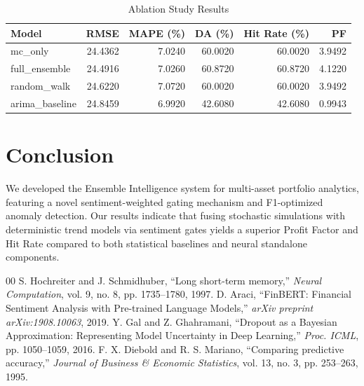 \documentclass[conference]{IEEEtran}
\begin{document}
\begin{table}[htbp]
\centering
\caption{Ablation Study Results}
\label{tab:model_comparison}
\begin{tabular}{l r r r r r}
\toprule
\textbf{Model} & \textbf{RMSE} & \textbf{MAPE (\%)} & \textbf{DA (\%)} & \textbf{Hit Rate (\%)} & \textbf{PF} \\
\midrule
mc\_only & 24.4362 & 7.0240 & 60.0020 & 60.0020 & 3.9492 \\
full\_ensemble & 24.4916 & 7.0260 & 60.8720 & 60.8720 & 4.1220 \\
random\_walk & 24.6220 & 7.0720 & 60.0020 & 60.0020 & 3.9492 \\
arima\_baseline & 24.8459 & 6.9920 & 42.6080 & 42.6080 & 0.9943 \\
\bottomrule
\end{tabular}
\end{table}

\section{Conclusion}
We developed the Ensemble Intelligence system for multi-asset portfolio 
analytics, featuring a novel sentiment-weighted gating mechanism and 
F1-optimized anomaly detection. Our results indicate that fusing 
stochastic simulations with deterministic trend models via sentiment 
gates yields a superior Profit Factor and Hit Rate compared to 
both statistical baselines and neural standalone components. 

\begin{thebibliography}{00}
 S. Hochreiter and J. Schmidhuber, ``Long short-term memory,'' \textit{Neural Computation}, vol. 9, no. 8, pp. 1735--1780, 1997.
 D. Araci, ``FinBERT: Financial Sentiment Analysis with Pre-trained Language Models,'' \textit{arXiv preprint arXiv:1908.10063}, 2019.
 Y. Gal and Z. Ghahramani, ``Dropout as a Bayesian Approximation: Representing Model Uncertainty in Deep Learning,'' \textit{Proc. ICML}, pp. 1050--1059, 2016.
 F. X. Diebold and R. S. Mariano, ``Comparing predictive accuracy,'' \textit{Journal of Business \& Economic Statistics}, vol. 13, no. 3, pp. 253--263, 1995.
\end{thebibliography}
\end{document}
